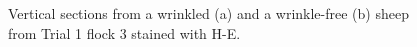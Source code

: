 %

\begin{figure}[!h]
\begin{minipage}[c][\textwidth][c]{\textheight}
 \vfill
  \caption{Vertical sections from a wrinkled (a) and a wrinkle-free (b) sheep from Trial 1 flock 3 stained with H-E. }
  \label{fig:trial1he}
\end{minipage}
\end{figure}

%

